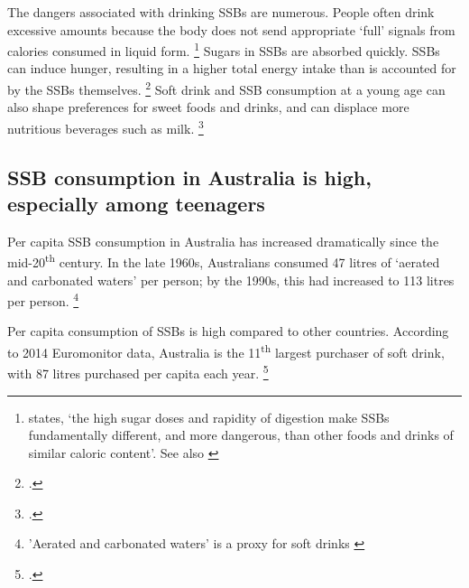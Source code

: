 \documentclass[embargoed]{grattan}
\begin{document}
The dangers associated with drinking SSBs are numerous.
People often drink excessive amounts because the body does not send appropriate `full' signals from calories consumed in liquid form.%
\footnote{\textcite{Mozaffarian2016politicssciencesoda} states, `the high sugar doses and rapidity of digestion make SSBs fundamentally different, and more dangerous, than other foods and drinks of similar caloric content'.
See also \textcites{Fletcher2011Aresoftdrink}{Malik2006Intakesugarsweetened}{Ruyter2012trialsugarfree}{Johnson2009Dietarysugarsintake}{Gill2006weightevidencesuggests}{Panel2014POLICYBRIEFoptions}{Malik2010Sugarsweetenedbeverages}{Popkin2012Sugarybeveragesrepresent}{PublicHealth2016SugaryDrinks}{Health2013AustralianDietaryGuidelines}} Sugars in SSBs are absorbed quickly.
SSBs can induce hunger, resulting in a higher total energy intake than is accounted for by the SSBs themselves.%
\footcites{Vartanian2007Effectssoftdrink}{St-Onge2004Addedthermogenicsatiety} Soft drink and SSB consumption at a young age can also shape preferences for sweet foods and drinks, and can displace more nutritious beverages such as milk.%
\footcites{Popkin2012Sugarybeveragesrepresent}{Malik2006Intakesugarsweetened}{Vartanian2007Effectssoftdrink}

\subsection{SSB consumption in Australia is high, especially among teenagers}\label{ssb-consumption-in-australia-is-high-especially-among-teenagers}

Per capita SSB consumption in Australia has increased dramatically since the mid-20\textsuperscript{th} century.
In the late 1960s, Australians consumed 47 litres of `aerated and carbonated waters' per person; by the 1990s, this had increased to 113 litres per person.%
\footnote{'Aerated and carbonated waters' is a proxy for soft drinks \textcite{ABS200043060Apparentconsumption}}

Per capita consumption of SSBs is high compared to other countries.
According to 2014 Euromonitor data, Australia is the 11\textsuperscript{th} largest purchaser of soft drink, with 87 litres purchased per capita each year.%
\footcites{Silver2015IdBuyEmerging}{Popkin2016Sweeteningglobaldiet}
\end{document}
